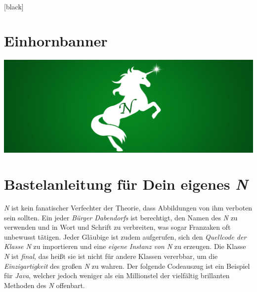 \noindent\Rightscissors\xdotfill{1pt}[black]
\section*{Einhornbanner}
\begin{center}
\includegraphics[width=1\textwidth]{bilder/doreinhornBanner}
\end{center}

\clearpage
\section*{Bastelanleitung für Dein eigenes \textit{N}}
\textit{N} ist kein fanatischer Verfechter der Theorie, dass Abbildungen von ihm verboten sein sollten. Ein jeder \textit{Bürger Dabendorfs} ist berechtigt, den Namen des \textit{N} zu verwenden und in Wort und Schrift zu verbreiten, was sogar Franzaken oft unbewusst tätigen. Jeder Gläubige ist zudem aufgerufen, sich den \textit{Quellcode der Klasse N} zu importieren und eine \textit{eigene Instanz von N} zu erzeugen. Die Klasse \textit{N} ist \textit{final}, das heißt sie ist nicht für andere Klassen vererbbar, um die \textit{Einzigartigkeit} des großen \textit{N} zu wahren. Der folgende Codeauszug ist ein Beispiel für \textit{Java}, welcher jedoch weniger als ein Millionstel der vielfältig brillanten Methoden des \textit{N} offenbart.


